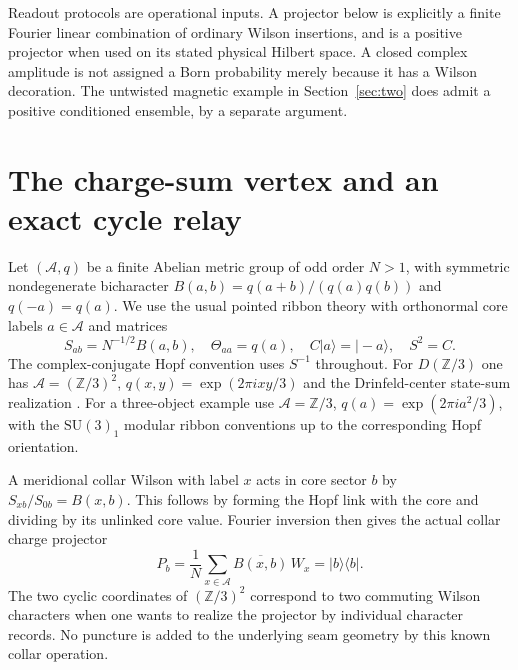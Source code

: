 \documentclass[11pt]{article}
\newcommand{\Z}{\mathbb Z}
\begin{document}
Readout protocols are operational inputs. A projector below is explicitly a finite Fourier linear combination of ordinary Wilson insertions, and is a positive projector when used on its stated physical Hilbert space. A closed complex amplitude is not assigned a Born probability merely because it has a Wilson decoration. The untwisted magnetic example in Section~\ref{sec:two} does admit a positive conditioned ensemble, by a separate argument.

\section{The charge-sum vertex and an exact cycle relay}
\label{sec:cycle}

Let \((\mathcal A,q)\) be a finite Abelian metric group of odd order \(N>1\), with symmetric nondegenerate bicharacter \(B(a,b)=q(a+b)/(q(a)q(b))\) and \(q(-a)=q(a)\). We use the usual pointed ribbon theory \cite{dgno,rt} with orthonormal core labels \(a\in\mathcal A\) and matrices
\[
 S_{ab}=N^{-1/2}B(a,b),\quad
 \Theta_{aa}=q(a),\quad C|a\rangle=|-a\rangle,\quad S^2=C.
\]
The complex-conjugate Hopf convention uses \(S^{-1}\) throughout. For \(D(\Z/3)\) one has \(\mathcal A=(\Z/3)^2\), \(q(x,y)=\exp(2\pi i xy/3)\) and the Drinfeld-center state-sum realization \cite{balsam}. For a three-object example use \(\mathcal A=\Z/3\), \(q(a)=\exp(2\pi i a^2/3)\), with the \(\mathrm{SU}(3)_1\) modular ribbon conventions up to the corresponding Hopf orientation.

A meridional collar Wilson with label \(x\) acts in core sector \(b\) by \(S_{xb}/S_{0b}=B(x,b)\). This follows by forming the Hopf link with the core and dividing by its unlinked core value. Fourier inversion then gives the actual collar charge projector
\begin{equation}
 P_b=\frac1N\sum_{x\in\mathcal A}\overline{B(x,b)}\,W_x
 =|b\rangle\langle b|.
 \label{eq:proj}
\end{equation}
The two cyclic coordinates of \((\Z/3)^2\) correspond to two commuting Wilson characters when one wants to realize the projector by individual character records. No puncture is added to the underlying seam geometry by this known collar operation.
\end{document}
